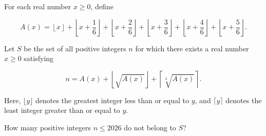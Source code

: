 For each real number $x\ge0$, define

\[
A(x)=
\left\lfloor x\right\rfloor
+\left\lfloor x+\dfrac{1}{6}\right\rfloor
+\left\lfloor x+\dfrac{2}{6}\right\rfloor
+\left\lfloor x+\dfrac{3}{6}\right\rfloor
+\left\lfloor x+\dfrac{4}{6}\right\rfloor
+\left\lfloor x+\dfrac{5}{6}\right\rfloor.
\]

Let $S$ be the set of all positive integers $n$ for which there exists a real number $x\ge0$ satisfying

\[
n=
A(x)
+\left\lfloor\sqrt{A(x)}\right\rfloor
+\left\lceil\sqrt[3]{A(x)}\right\rceil.
\]

Here, $\lfloor y\rfloor$ denotes the greatest integer less than or equal to $y$, and $\lceil y\rceil$ denotes the least integer greater than or equal to $y$.

How many positive integers $n\le2026$ do not belong to $S$?
